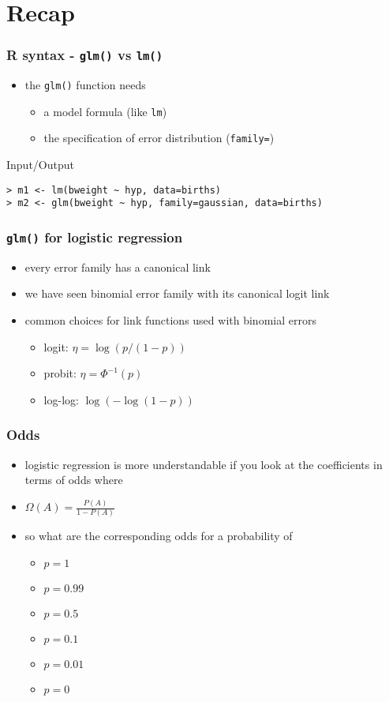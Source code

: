 \section{Recap}

\begin{frame}[fragile]\frametitle{R syntax - \texttt{glm()} vs \texttt{lm()}}
  \begin{itemize}
  \item the \texttt{glm()} function needs
    \begin{itemize}
    \item a model formula (like \texttt{lm})
    \item the specification of error distribution (\texttt{family=})
    \end{itemize}
  \end{itemize}
\begin{exampleblock}{Input/Output}\small
\begin{verbatim}
> m1 <- lm(bweight ~ hyp, data=births)
> m2 <- glm(bweight ~ hyp, family=gaussian, data=births)
\end{verbatim}
\end{exampleblock}
\end{frame}

\begin{frame}\frametitle{\texttt{glm()} for logistic regression}
  \begin{itemize}
    \item every error family has a canonical link
    \item we have seen binomial error family with its canonical logit link
    \item common choices for link functions used with binomial errors
      \begin{itemize}
      \item logit: $\eta = \log(p/(1-p))$
      \item probit: $\eta = \Phi^{-1}(p)$ 
      \item log-log: $\log(-\log(1-p))$
      \end{itemize}
  \end{itemize}
\end{frame}


\begin{frame}\frametitle{Odds}
  \begin{itemize}
    \item logistic regression is more understandable if you look at the coefficients in terms of odds where
    \item $\Omega(A) = \frac{P(A)}{1-P(A)}$
    \item so what are the corresponding odds for a probability of
      \begin{itemize}
      \item $p = 1$
      \item $p = 0.99$
      \item $p = 0.5$
      \item $p = 0.1$
      \item $p = 0.01$
      \item $p = 0$        
      \end{itemize}
  \end{itemize}
\end{frame}


